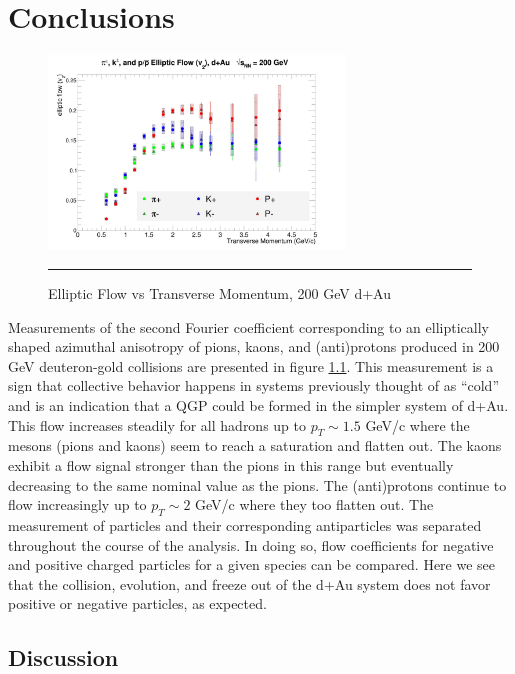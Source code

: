 
\chapter{Conclusions} %

\begin{figure}[hbtp]

\centering
    \includegraphics[width=0.7\textwidth]{results/v2all.jpg}
    \rule{35em}{0.5pt}
    \caption[Elliptic Flow vs Transverse Momentum, 200 GeV d+Au]{Elliptic Flow vs Transverse Momentum, 200 GeV d+Au}
    \label{fig:v2main}
\end{figure}

Measurements of the second Fourier coefficient corresponding to an elliptically shaped azimuthal anisotropy of pions, kaons, and (anti)protons produced in 200 GeV deuteron-gold collisions are presented in figure \ref{fig:v2main}. This measurement is a sign that collective behavior happens in systems previously thought of as ``cold'' and is an indication that a QGP could be formed in the simpler system of d+Au. This flow increases steadily for all hadrons up to $p_T \sim 1.5 $ GeV/c where the mesons (pions and kaons) seem to reach a saturation and flatten out. The kaons exhibit a flow signal stronger than the pions in this range but eventually decreasing to the same nominal value as the pions. The (anti)protons continue to flow increasingly up to $p_T \sim 2$ GeV/c where they too flatten out. The measurement of particles and their corresponding antiparticles was separated throughout the course of the analysis. In doing so, flow coefficients for negative and positive charged particles for a given species can be compared. Here we see that the collision, evolution, and freeze out of the d+Au system does not favor positive or negative particles, as expected.

\section{Discussion}

